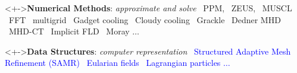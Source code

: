 \begin{frame}[fragile,label=ss-motivation]
\begin{block}<+->{\textbf{Numerical Methods}: \textit{approximate and solve}}
    \textcolor{green!50!black}{
\footnotesize     \textbullet\ PPM, \textbullet\ ZEUS, \textbullet\ MUSCL
     \textbullet\ FFT \textbullet\ multigrid
     \textbullet\ Gadget cooling
     \textbullet\ Cloudy cooling
     \textbullet\ Grackle
     \textbullet\ Dedner MHD
     \textbullet\ MHD-CT
     \textbullet\ Implicit FLD
     \textbullet\ Moray \Large $\ldots$
     }
  \end{block}

\begin{block}<+->{\textbf{Data Structures}: \textit{computer representation}}
    \textcolor{blue}{
\footnotesize
    \textbullet\ Structured Adaptive Mesh Refinement (SAMR)
    \textbullet\ Eularian fields
    \textbullet\ Lagrangian particles
 \Large $\ldots$}
  
\end{block}

\end{frame}


